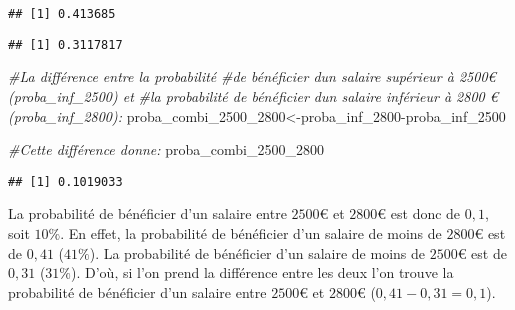 \documentclass[
]{book}
\newenvironment{Shaded}{\begin{snugshade}}{\end{snugshade}}
\newcommand{\AttributeTok}[1]{\textcolor[rgb]{0.77,0.63,0.00}{#1}}
\newcommand{\CommentTok}[1]{\textcolor[rgb]{0.56,0.35,0.01}{\textit{#1}}}
\newcommand{\DecValTok}[1]{\textcolor[rgb]{0.00,0.00,0.81}{#1}}
\newcommand{\FunctionTok}[1]{\textcolor[rgb]{0.00,0.00,0.00}{#1}}
\newcommand{\NormalTok}[1]{#1}
\newcommand{\OtherTok}[1]{\textcolor[rgb]{0.56,0.35,0.01}{#1}}
\newcommand{\SpecialCharTok}[1]{\textcolor[rgb]{0.00,0.00,0.00}{#1}}
\begin{document}
\begin{verbatim}
## [1] 0.413685
\end{verbatim}

\begin{Shaded}
\end{Shaded}

\begin{verbatim}
## [1] 0.3117817
\end{verbatim}

\begin{Shaded}
\begin{Highlighting}[]
\CommentTok{\#La différence entre la probabilité}
\CommentTok{\#de bénéficier d\textquotesingle{}un salaire supérieur à 2500€ (proba\_inf\_2500) et}
\CommentTok{\#la probabilité de bénéficier d\textquotesingle{}un salaire inférieur à 2800 € (proba\_inf\_2800):}
\NormalTok{proba\_combi\_2500\_2800}\OtherTok{\textless{}{-}}\NormalTok{proba\_inf\_2800}\SpecialCharTok{{-}}\NormalTok{proba\_inf\_2500}

\CommentTok{\#Cette différence donne:}
\NormalTok{proba\_combi\_2500\_2800}
\end{Highlighting}
\end{Shaded}

\begin{verbatim}
## [1] 0.1019033
\end{verbatim}

La probabilité de bénéficier d'un salaire entre \(2500€\) et \(2800€\) est donc de \(0,1\), soit \(10\%\). En effet, la probabilité de bénéficier d'un salaire de moins de \(2800€\) est de \(0,41\) (\(41\%\)). La probabilité de bénéficier d'un salaire de moins de \(2500€\) est de \(0,31\) (\(31\%\)). D'où, si l'on prend la différence entre les deux l'on trouve la probabilité de bénéficier d'un salaire entre \(2500€\) et \(2800€\) (\(0,41-0,31=0,1\)).
\end{document}

